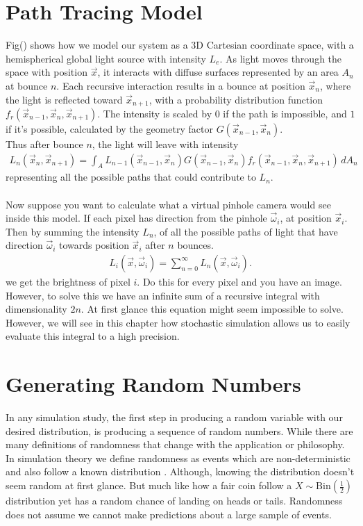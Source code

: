 \documentclass{article}
\begin{document}
\section{Path Tracing Model}
Fig() shows how we model our system as a 3D Cartesian coordinate space, with a 
hemispherical global light source with intensity $L_e$. As light moves through the 
space with position $\vec{x}$, it interacts with diffuse surfaces 
represented by an area $A_n$ at bounce $n$.
Each recursive interaction results in a bounce at position $\vec{x}_n$, 
where the light is reflected toward $\vec{x}_{n+1}$, with a probability distribution function 
$f_{r}(\vec{x}_{n-1},\vec{x}_{n},\vec{x}_{n+1})$. The intensity is scaled by
$0$ if the path is impossible, and $1$ if it's possible, calculated by the
geometry factor $G(\vec{x}_{n-1},\vec{x}_n)$.\\
Thus after bounce $n$, the light will leave with intensity 
\begin{align}
    L_n(\vec{x}_n,\vec{x}_{n+1}) = 
    \int_{A} L_{n-1}(\vec{x}_{n-1},\vec{x}_n)G(\vec{x}_{n-1},\vec{x}_n)
    f_r(\vec{x}_{n-1},\vec{x}_n,\vec{x}_{n+1})\,dA_n
\end{align}
representing all the possible paths that could contribute to $L_n$.
\\
\\
Now suppose you want to calculate what a virtual pinhole camera would see inside this model.
If each pixel has direction from the pinhole $\vec{\omega}_i$, at position $\vec{x}_i$.
Then by summing the intensity $L_{n}$,
of all the possible paths of light that have direction $\vec{\omega}_i$ towards
position $\vec{x}_i$ after $n$ bounces.
\begin{align}
    L_i(\vec{x},\vec{\omega}_i) = \sum_{n=0}^{\infty}L_n(\vec{x},\vec{\omega}_i).
\end{align}
we get the brightness of pixel $i$. Do this for every pixel and you have an image.
\\
However, to solve this we have an infinite sum of a recursive integral with dimensionality $2n$.
At first glance this equation might seem impossible to solve. However, we will see in this chapter how
stochastic simulation allows us to easily evaluate this integral to a high
precision. \cite{KajiyaJamesT.1986Tre} 

\section{Generating Random Numbers}
In any simulation study, the first step in producing a random variable with our desired 
distribution, is producing a sequence of random numbers.
While there are many definitions of randomness that change with the application or 
philosophy.
In simulation theory we define randomness as events which are non-deterministic 
and also follow a known distribution \cite{shiryaev2016probability}. 
Although, knowing the distribution doesn't seem random at first glance. 
But much like how a fair coin follow a $X \sim \text{Bin}(\frac{1}{2})$ distribution
yet has a random chance of landing on heads or tails. Randomness does not assume we 
cannot make predictions about a large sample of events.
\end{document}
